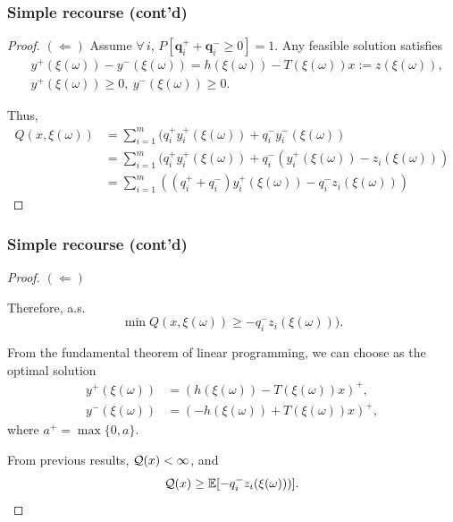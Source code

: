 \documentclass{beamer}
\begin{document}
\begin{frame}
\frametitle{Simple recourse (cont'd)}
	
\begin{proof}

{\bf $(\Leftarrow)$}
Assume $\forall\, i$, $P[\boldsymbol{q}_i^+ + \boldsymbol{q}_i^- \geq 0] = 1$.
Any feasible solution satisfies
\begin{align*}
& y^+(\xi(\omega))-y^-(\xi(\omega))=h(\xi(\omega))-T(\xi(\omega))x := z(\xi(\omega)), \\
& y^+(\xi(\omega)) \geq 0,\ y^-(\xi(\omega)) \geq 0.
\end{align*}

Thus,
\begin{align*}
Q(x,\xi(\omega)) &= \sum_{i=1}^{m} (q_i^+y_i^+(\xi(\omega)) + q_i^-y_i^-(\xi(\omega)) \\
&= \sum_{i=1}^{m} (q_i^+y_i^+(\xi(\omega)) + q_i^-(y_i^+(\xi(\omega))-z_i(\xi(\omega))) \\
&= \sum_{i=1}^{m} ((q_i^+ + q_i^-)y_i^+(\xi(\omega))-q_i^-z_i(\xi(\omega)))
\end{align*}

\end{proof}

\end{frame}

\begin{frame}
\frametitle{Simple recourse (cont'd)}

\begin{proof}
{\bf $(\Leftarrow)$}

Therefore, a.s.
$$
\min Q(x,\xi(\omega)) \geq -q_i^-z_i(\xi(\omega))).
$$

From the fundamental theorem of linear programming, we can choose as the optimal solution
\begin{align*}
	y^+(\xi(\omega)) &= \left(h(\xi(\omega))-T(\xi(\omega))x\right)^+,\\
	y^-(\xi(\omega)) &= \left(-h(\xi(\omega))+T(\xi(\omega))x\right)^+,
\end{align*}
where $a^+ = \max\{0, a\}$.

From previous results, ${\mathcal{Q}}(x) < \infty$, and
$$
{\mathcal{Q}}(x) \geq {\mathbb{E}}[-q_i^-z_i(\xi(\omega)))].
$$
\end{proof}

\end{frame}
\end{document}
